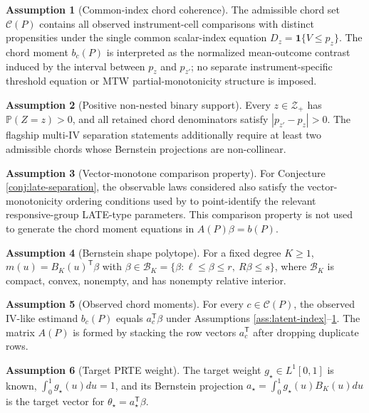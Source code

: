 \documentclass[11pt]{article}
\renewcommand{\Pr}{\mathbb{P}}
\newcommand{\one}{\mathbf{1}}
\newcommand{\transpose}{\mathsf{T}}
\theoremstyle{definition}
\newtheorem{assumption}{Assumption}
\theoremstyle{plain}
\theoremstyle{remark}
\begin{document}
\begin{assumption}[Common-index chord coherence]\label{ass:partial-monotone}
The admissible chord set \(\mathcal C(P)\) contains all observed instrument-cell comparisons with distinct propensities under the single common scalar-index equation \(D_z=\one\{V\le p_z\}\). The chord moment \(b_c(P)\) is interpreted as the normalized mean-outcome contrast induced by the interval between \(p_z\) and \(p_{z'}\); no separate instrument-specific threshold equation or MTW partial-monotonicity structure is imposed.
\end{assumption}

\begin{assumption}[Positive non-nested binary support]\label{ass:support}
Every \(z\in\mathcal Z_+\) has \(\Pr(Z=z)>0\), and all retained chord denominators satisfy \(|p_{z'}-p_z|>0\). The flagship multi-IV separation statements additionally require at least two admissible chords whose Bernstein projections are non-collinear.
\end{assumption}

\begin{assumption}[Vector-monotone comparison property]\label{ass:vector-monotone}
For Conjecture \ref{conj:late-separation}, the observable laws considered also satisfy the vector-monotonicity ordering conditions used by \citet{Goff2024} to point-identify the relevant responsive-group LATE-type parameters. This comparison property is not used to generate the chord moment equations in \(A(P)\beta=b(P)\).
\end{assumption}

\begin{assumption}[Bernstein shape polytope]\label{ass:bernstein}
For a fixed degree \(K\geq1\), \(m(u)=B_K(u)^\transpose\beta\) with \(\beta\in\mathcal B_K=\{\beta:\ell\leq\beta\leq r,\ R\beta\leq s\}\), where \(\mathcal B_K\) is compact, convex, nonempty, and has nonempty relative interior.
\end{assumption}

\begin{assumption}[Observed chord moments]\label{ass:moments}
For every \(c\in\mathcal C(P)\), the observed IV-like estimand \(b_c(P)\) equals \(a_c^\transpose\beta\) under Assumptions \ref{ass:latent-index}--\ref{ass:partial-monotone}. The matrix \(A(P)\) is formed by stacking the row vectors \(a_c^\transpose\) after dropping duplicate rows.
\end{assumption}

\begin{assumption}[Target PRTE weight]\label{ass:target}
The target weight \(g_\star\in L^1[0,1]\) is known, \(\int_0^1g_\star(u)du=1\), and its Bernstein projection \(a_\star=\int_0^1g_\star(u)B_K(u)du\) is the target vector for \(\theta_\star=a_\star^\transpose\beta\).
\end{assumption}
\end{document}
